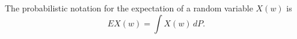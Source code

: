 The probabilistic notation for the expectation of a random variable $X(w)$ is
$$EX(w) = \int X(w) \, dP.$$
